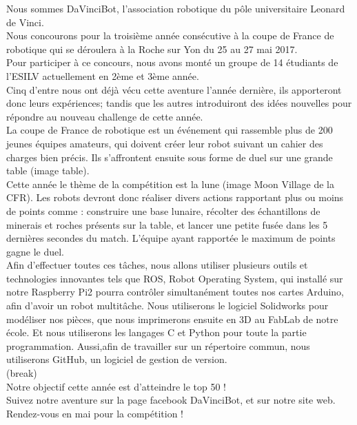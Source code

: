 \documentclass[12pt]{report}
\begin{document}
Nous sommes DaVinciBot, l'association robotique du pôle universitaire Leonard de Vinci. 
\\Nous concourons pour la troisième année consécutive à la coupe de France de robotique qui  se déroulera à la  Roche sur Yon du 25 au 27 mai 2017.
\\Pour participer à ce concours, nous avons monté un groupe de 14 étudiants de l'ESILV actuellement en 2ème et 3ème année.
\\Cinq d'entre nous ont déjà vécu cette aventure l'année dernière, ils apporteront donc leurs expériences; tandis que les autres introduiront des idées nouvelles pour répondre au nouveau challenge de cette année. 
\\La coupe de France de robotique est un événement qui rassemble plus de 200 jeunes équipes amateurs, qui doivent créer leur robot suivant un cahier des charges bien précis. Ils s'affrontent ensuite sous forme de duel sur une grande table (image table).
\\Cette année le thème de la compétition est la lune (image Moon Village de la CFR). Les robots devront donc réaliser divers actions rapportant plus ou moins de points comme : construire  une base lunaire, récolter des échantillons de minerais et roches présents sur la table, et lancer une petite fusée dans les 5 dernières secondes du match. L'équipe ayant rapportée le maximum de points gagne le duel.
\\Afin d'effectuer toutes ces tâches, nous allons utiliser plusieurs outils et technologies innovantes tels que ROS, Robot Operating System, qui installé sur notre Raspberry Pi2 pourra contrôler simultanément toutes nos cartes Arduino, afin d'avoir un robot multitâche. Nous  utiliserons le logiciel Solidworks pour modéliser nos pièces, que nous imprimerons ensuite en 3D au FabLab de notre école. Et nous utiliserons les langages C et Python pour toute la partie programmation. Aussi,afin de travailler sur un répertoire commun, nous utiliserons GitHub, un logiciel de gestion de version.
\\(break)
\\Notre objectif cette année est d'atteindre le top 50 ! 
\\Suivez notre aventure sur la page facebook DaVinciBot, et sur notre site web. 
\\Rendez-vous en mai pour la compétition !
\end{document}
